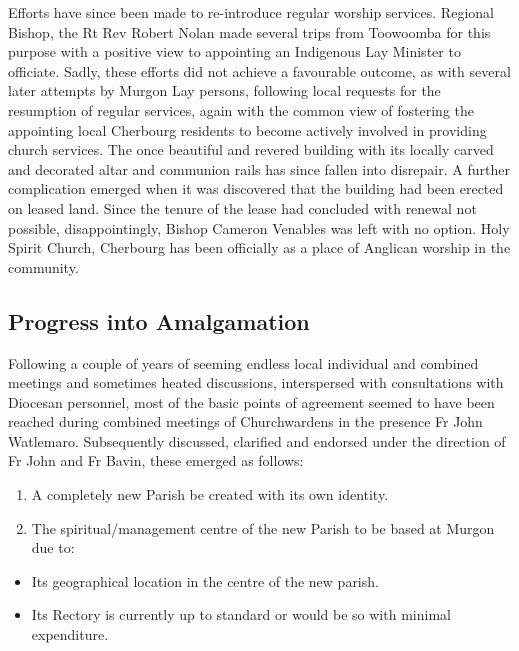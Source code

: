 Efforts have since been made to re-introduce regular worship services. Regional Bishop, the Rt Rev Robert Nolan made several trips from Toowoomba for this purpose with a positive view to appointing an Indigenous Lay Minister to officiate. Sadly, these efforts did not achieve a favourable outcome, as with several later attempts by Murgon Lay persons, following local requests for the resumption of regular services, again with the common view of fostering the appointing local Cherbourg residents to become actively involved in providing church services. The once beautiful and revered building with its locally carved and decorated altar and communion rails has since fallen into disrepair. A further complication emerged when it was discovered that the building had been erected on leased land. Since the tenure of the lease had concluded with renewal not possible, disappointingly, Bishop Cameron Venables was left with no option. Holy Spirit Church, Cherbourg has been officially as a place of Anglican worship in the community.

\hypertarget{progress-into-amalgamation}{%
\subsection{Progress into Amalgamation}\label{progress-into-amalgamation}}

Following a couple of years of seeming endless local individual and combined meetings and sometimes heated discussions, interspersed with consultations with Diocesan personnel, most of the basic points of agreement seemed to have been reached during combined meetings of Churchwardens in the presence Fr John Watlemaro. Subsequently discussed, clarified and endorsed under the direction of Fr John and Fr Bavin, these emerged as follows:

\begin{enumerate}
\def\labelenumi{\arabic{enumi}.}
\item
  A completely new Parish be created with its own identity.
\item
  The spiritual/management centre of the new Parish to be based at Murgon due to:
\end{enumerate}

\begin{itemize}
\item
  Its geographical location in the centre of the new parish.
\item
  Its Rectory is currently up to standard or would be so with minimal expenditure.
\end{itemize}

